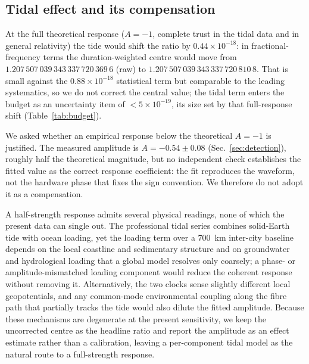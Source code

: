 \documentclass[11pt,a4paper]{article}
\newcommand{\e}[1]{\times 10^{#1}}
\begin{document}



\subsection{Tidal effect and its compensation}
\label{sec:tidal-theory}

At the full theoretical response ($A=-1$, complete trust in the tidal
data and in general relativity) the tide would shift the ratio by
$0.44\e{-18}$: in fractional-frequency terms the duration-weighted centre
would move from $1.207\,507\,039\,343\,337\,720\,369\,6$ (raw) to
$1.207\,507\,039\,343\,337\,720\,810\,8$. That is small against the
$0.88\e{-18}$ statistical term but comparable to the leading systematics,
so we do not correct the central value; the tidal term enters the budget
as an uncertainty item of $<5\e{-19}$, its size set by that full-response
shift (Table~\ref{tab:budget}).

We asked whether an empirical response below the theoretical $A=-1$ is
justified. The measured amplitude is $A=-0.54\pm0.08$
(Sec.~\ref{sec:detection}), roughly half the theoretical magnitude, but
no independent check establishes the fitted value as the correct response
coefficient: the fit reproduces the waveform, not the hardware phase that
fixes the sign convention. We therefore do not adopt it as a compensation.

A half-strength response admits several physical readings, none of which
the present data can single out. The professional tidal series combines
solid-Earth tide with ocean loading, yet the loading term over a
\qty{700}{km} inter-city baseline depends on the local coastline and
sedimentary structure and on groundwater and hydrological loading that a
global model resolves only coarsely; a phase- or amplitude-mismatched
loading component would reduce the coherent response without removing it.
Alternatively, the two clocks sense slightly different local geopotentials,
and any common-mode environmental coupling along the fibre path that
partially tracks the tide would also dilute the fitted amplitude. Because
these mechanisms are degenerate at the present sensitivity, we keep the
uncorrected centre as the headline ratio and report the amplitude as an
effect estimate rather than a calibration, leaving a per-component tidal
model as the natural route to a full-strength response.
\end{document}

